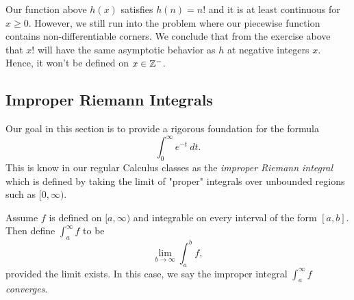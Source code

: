 Our function above \( h(x)  \) satisfies \( h(n) = n!   \) and it is at least continuous for \( x \geq 0  \). However, we still run into the problem where our piecewise function contains non-differentiable corners. We conclude that from the exercise above that \( x!  \) will have the same asymptotic behavior as \( h  \) at negative integers \( x  \). Hence, it won't be defined on \( x \in \mathbb{Z}^{-} \).

\subsection{Improper Riemann Integrals} 

Our goal in this section is to provide a rigorous foundation for the formula
\[  \int_{ 0 }^{ \infty  }  e^{-t} \ dt. \] 
This is know in our regular Calculus classes as the \textit{improper Riemann integral} which is defined by taking the limit of "proper" integrals over unbounded regions such as \( [0,\infty ) \). 

\begin{definition}{}{}
    Assume \( f  \) is defined on \( [a,\infty ) \) and integrable on every interval of the form \( [a,b]  \). Then define \( \int_{ a }^{ \infty  }  f  \) to be  
    \[  \lim_{ b \to \infty  }  \int_{ a }^{ b } f,  \] provided the limit exists. In this case, we say the improper integral \( \int_{ a }^{ \infty  }  f  \) \textit{converges}. 
\end{definition}

